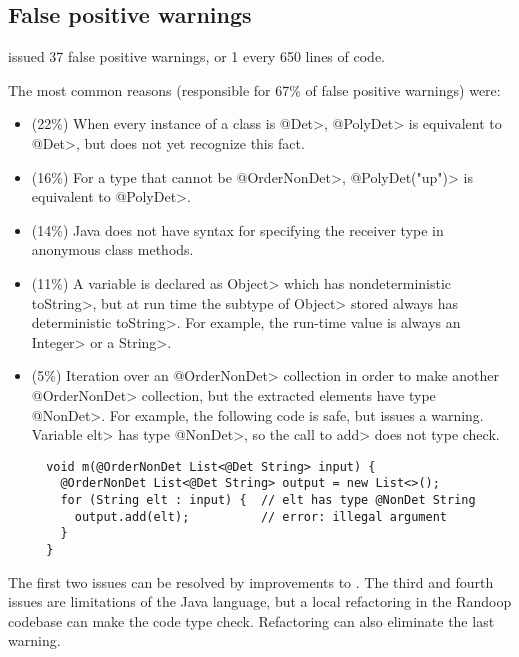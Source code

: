 \subsection{False positive warnings}

\TheDeterminismChecker issued 37 false positive warnings, or 1 every 650
lines of code.

The most common reasons (responsible for 67\% of false positive warnings)
were:

\begin{itemize}
\item   (22\%)
  When every instance of a class is \<@Det>, \<@PolyDet> is equivalent to
  \<@Det>, but \theDeterminismChecker does not yet recognize this fact.
\item  (16\%)
  For a type that cannot be \<@OrderNonDet>, \<@PolyDet("up")> is
  equivalent to \<@PolyDet>.
\item (14\%)
  Java does not have syntax for specifying the receiver type in anonymous class
  methods.
\item (11\%)
  A variable is declared as \<Object> which has nondeterministic \<toString>,
  but at run time the subtype of \<Object> stored always has deterministic \<toString>.  For
  example, the run-time value is always an \<Integer> or a \<String>.
\item (5\%)
  Iteration over an \<@OrderNonDet> collection in order to make another
  \<@OrderNonDet> collection, but the extracted elements have type
  \<@NonDet>.  For example, the following code is safe, but
  \theDeterminismChecker issues a warning.  Variable \<elt> has type
  \<@NonDet>, so the call to \<add> does not type check.
\begin{Verbatim}
  void m(@OrderNonDet List<@Det String> input) {
    @OrderNonDet List<@Det String> output = new List<>();
    for (String elt : input) {  // elt has type @NonDet String
      output.add(elt);          // error: illegal argument
    }
  }
\end{Verbatim}
  
\end{itemize}

The first two issues can be resolved by improvements to
\theDeterminismCheckerImplementation.
The third and fourth issues are limitations of the Java language, but a
local refactoring in the Randoop codebase can make the code type check.
Refactoring can also eliminate the last warning. 


